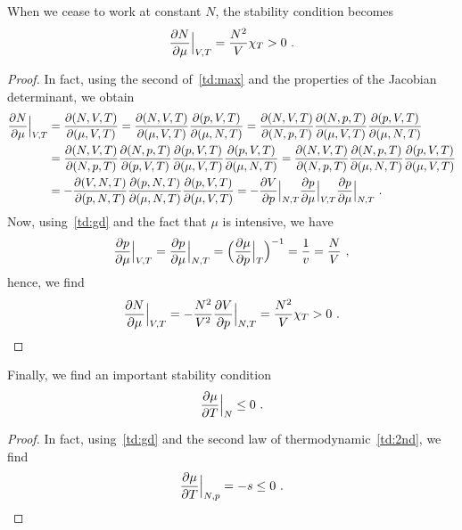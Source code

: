     When we cease to work at constant $N$, the stability condition becomes
    \begin{equation*}
        \frac{\partial N}{\partial\mu} \Big \vert_{V, T} = \frac{N^2}{V} \chi_T > 0 ~.
    \end{equation*}
    \begin{proof}
        In fact, using the second of~\eqref{td:max} and the properties of the Jacobian determinant, we obtain
        \begin{equation*}
        \begin{aligned}
            \frac{\partial N}{\partial\mu} \Big \vert_{V, T} & = \frac{\partial(N, V, T)}{\partial(\mu, V, T)} = \frac{\partial(N, V, T)}{\partial(\mu, V, T)} \frac{\partial(p, V, T)}{\partial(\mu, N, T)} = \frac{\partial(N, V, T)}{\partial(N, p, T)}\frac{\partial(N, p, T)}{\partial(\mu, V, T)} \frac{\partial(p, V, T)}{\partial(\mu, N, T)} \\ & = \frac{\partial(N, V, T)}{\partial(N, p, T)} \frac{\partial(N, p, T)}{\partial(p, V, T)} \frac{\partial(p, V, T)}{\partial(\mu, V, T)} \frac{\partial(p, V, T)}{\partial(\mu, N, T)} = \frac{\partial(N, V, T)}{\partial(N, p, T)} \frac{\partial(N, p, T)}{\partial(\mu, N, T)} \frac{\partial(p, V, T)}{\partial(\mu, V, T)} \\ & = - \frac{\partial(V, N, T)}{\partial(p, N, T)} \frac{\partial(p, N, T)}{\partial(\mu, N, T)} \frac{\partial(p, V, T)}{\partial(\mu, V, T)} = - \frac{\partial V}{\partial p} \Big \vert_{N, T}  \frac{\partial p}{\partial\mu} \Big \vert_{V, T} \frac{\partial p}{\partial\mu} \Big \vert_{N, T} ~.
        \end{aligned}
        \end{equation*}
        Now, using~\eqref{td:gd} and the fact that $\mu$ is intensive, we have
        \begin{equation*}
            \frac{\partial p}{\partial\mu} \Big \vert_{V, T} = \frac{\partial p}{\partial\mu} \Big \vert_{N, T} = \Big ( \frac{\partial\mu}{\partial p} \Big \vert_T \Big)^{-1} = \frac{1}{v} = \frac{N}{V} ~,
        \end{equation*}
        hence, we find
        \begin{equation*}
        \frac{\partial N}{\partial\mu} \Big \vert_{V, T} = - \frac{N^2}{V^2} \frac{\partial V}{\partial p} \Big \vert_{N,T} = \frac{N^2}{V} \chi_T > 0 ~.
        \end{equation*}
    \end{proof}

    Finally, we find an important stability condition
    \begin{equation}\label{td:muT}
        \frac{\partial\mu}{\partial T} \Big \vert_N \leq 0 ~.
    \end{equation}
    \begin{proof}
        In fact, using~\eqref{td:gd} and the second law of thermodynamic~\eqref{td:2nd}, we find 
        \begin{equation*}
            \frac{\partial\mu}{\partial T} \Big \vert_{N, p} = - s \leq 0 ~.
        \end{equation*}
    \end{proof}
